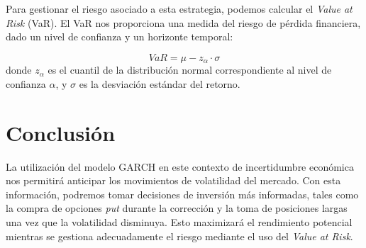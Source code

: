 \documentclass{article}
\begin{document}
Para gestionar el riesgo asociado a esta estrategia, podemos calcular el \textit{Value at Risk} (VaR). El VaR nos proporciona una medida del riesgo de pérdida financiera, dado un nivel de confianza y un horizonte temporal:

\begin{equation}
    VaR = \mu - z_{\alpha} \cdot \sigma
\end{equation}
donde \( z_{\alpha} \) es el cuantil de la distribución normal correspondiente al nivel de confianza \( \alpha \), y \( \sigma \) es la desviación estándar del retorno.

\section{Conclusión}

La utilización del modelo GARCH en este contexto de incertidumbre económica nos permitirá anticipar los movimientos de volatilidad del mercado. Con esta información, podremos tomar decisiones de inversión más informadas, tales como la compra de opciones \textit{put} durante la corrección y la toma de posiciones largas una vez que la volatilidad disminuya. Esto maximizará el rendimiento potencial mientras se gestiona adecuadamente el riesgo mediante el uso del \textit{Value at Risk}.
\end{document}
